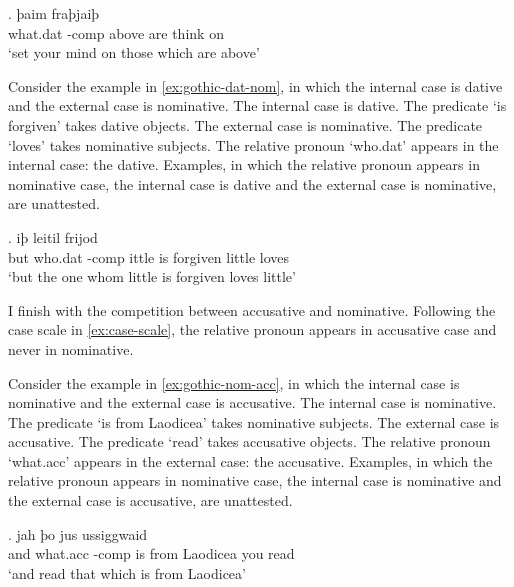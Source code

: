 \exg. þaim    fraþjaiþ \\
 what.\ac{dat} -\ac{comp} above are\scsub{[nom]} {think on}\scsub{[dat]}\\
 `set your mind on those which are above' \label{ex:gothic-nom-dat}

Consider the example in \ref{ex:gothic-dat-nom}, in which the internal case is dative and the external case is nominative.
The internal case is dative. The predicate  `is forgiven' takes dative objects.
The external case is nominative. The predicate  `loves' takes nominative subjects.
The relative pronoun  `who.\ac{dat}' appears in the internal case: the dative.
Examples, in which the relative pronoun appears in nominative case, the internal case is dative and the external case is nominative, are unattested.

\exg. iþ     leitil frijod\\
 but who.\ac{dat} -\ac{comp} ittle {is forgiven}\scsub{[dat]} little loves\scsub{[nom]}\\
 `but the one whom little is forgiven loves little' \label{ex:gothic-dat-nom}

I finish with the competition between accusative and nominative. Following the case scale in \ref{ex:case-scale}, the relative pronoun appears in accusative case and never in nominative.

Consider the example in \ref{ex:gothic-nom-acc}, in which the internal case is nominative and the external case is accusative.
The internal case is nominative. The predicate  `is from Laodicea' takes nominative subjects.
The external case is accusative. The predicate  `read' takes accusative objects.
The relative pronoun  `what.\ac{acc}' appears in the external case: the accusative.
Examples, in which the relative pronoun appears in nominative case, the internal case is nominative and the external case is accusative, are unattested.

\exg. jah þo     jus ussiggwaid\\
 and what.\ac{acc} -\ac{comp} is\scsub{[nom]} from Laodicea you read\scsub{[acc]}\\
 `and read that which is from Laodicea' \label{ex:gothic-nom-acc}

